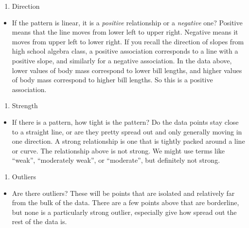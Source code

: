 \documentclass[
]{book}
\providecommand{\tightlist}{%
  \setlength{\itemsep}{0pt}\setlength{\parskip}{0pt}}
\begin{document}
\begin{enumerate}
\def\labelenumi{\arabic{enumi}.}
\setcounter{enumi}{1}
\tightlist
\item
  Direction
\end{enumerate}

\begin{itemize}
\tightlist
\item
  If the pattern is linear, it is a \emph{positive} relationship or a \emph{negative} one? Positive means that the line moves from lower left to upper right. Negative means it moves from upper left to lower right. If you recall the direction of slopes from high school algebra class, a positive association corresponds to a line with a positive slope, and similarly for a negative association. In the data above, lower values of body mass correspond to lower bill lengths, and higher values of body mass correspond to higher bill lengths. So this is a positive association.
\end{itemize}

\begin{enumerate}
\def\labelenumi{\arabic{enumi}.}
\setcounter{enumi}{2}
\tightlist
\item
  Strength
\end{enumerate}

\begin{itemize}
\tightlist
\item
  If there is a pattern, how tight is the pattern? Do the data points stay close to a straight line, or are they pretty spread out and only generally moving in one direction. A strong relationship is one that is tightly packed around a line or curve. The relationship above is not strong. We might use terms like ``weak'', ``moderately weak'', or ``moderate'', but definitely not strong.
\end{itemize}

\begin{enumerate}
\def\labelenumi{\arabic{enumi}.}
\setcounter{enumi}{3}
\tightlist
\item
  Outliers
\end{enumerate}

\begin{itemize}
\tightlist
\item
  Are there outliers? These will be points that are isolated and relatively far from the bulk of the data. There are a few points above that are borderline, but none is a particularly strong outlier, especially give how spread out the rest of the data is.
\end{itemize}
\end{document}
